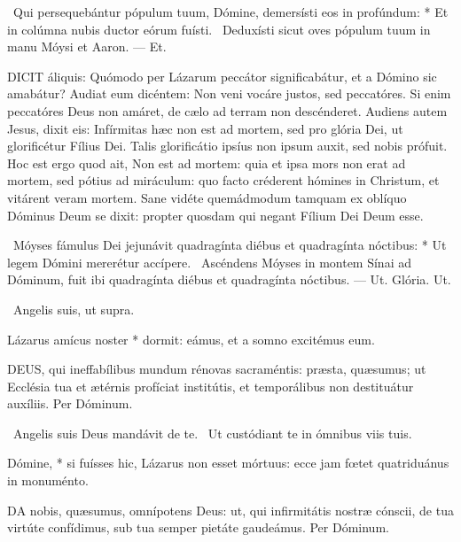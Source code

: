 \R\ Qui persequebántur pópulum tuum, Dómine, demersísti eos in profúndum: * Et in colúmna nubis ductor eórum fuísti. \V\ Deduxísti sicut oves pópulum tuum in manu Móysi et Aaron. --- Et.


\lettrine[lines=2]{D}{ICIT} áliquis: Quómodo per Lázarum peccátor significabátur, et a Dómino sic amabátur? Audiat eum dicéntem: Non veni vocáre justos, sed peccatóres. Si enim peccatóres Deus non amáret, de cælo ad terram non descénderet. Audiens autem Jesus, dixit eis: Infírmitas hæc non est ad mortem, sed pro glória Dei, ut glorificétur Fílius Dei. Talis glorificátio ipsíus non ipsum auxit, sed nobis prófuit. Hoc est ergo quod ait, Non est ad mortem: quia et ipsa mors non erat ad mortem, sed pótius ad miráculum: quo facto créderent hómines in Christum, et vitárent veram mortem. Sane vidéte quemádmodum tamquam ex oblíquo Dóminus Deum se dixit: propter quosdam qui negant Fílium Dei Deum esse.

\R\ Móyses fámulus Dei jejunávit quadragínta diébus et quadragínta nóctibus: * Ut legem Dómini mererétur accípere. \V\ Ascéndens Móyses in montem Sínai ad Dóminum, fuit ibi quadragínta diébus et quadragínta nóctibus. --- Ut. Glória. Ut.

\V\ Angelis suis, ut supra.

 Lázarus amícus noster * dormit: eámus, et a somno excitémus eum.


\lettrine[lines=2]{D}{EUS}, qui ineffabílibus mundum rénovas sacraméntis: præsta, quæsumus; ut Ecclésia tua et ætérnis profíciat institútis, et temporálibus non destituátur auxíliis. Per Dóminum.

\V\ Angelis suis Deus mandávit de te. \R\ Ut custódiant te in ómnibus viis tuis.

 Dómine, * si fuísses hic, Lázarus non esset mórtuus: ecce jam fœtet quatriduánus in monuménto.


\lettrine[lines=2]{D}{A} nobis, quæsumus, omnípotens Deus: ut, qui infirmitátis nostræ cónscii, de tua virtúte confídimus, sub tua semper pietáte gaudeámus. Per Dóminum.

\sectionornament




